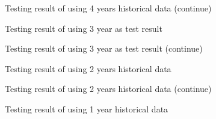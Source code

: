 \begin{figure}[h]
	\centering
	\caption{Testing result of using 4 years historical data (continue)}
	\label{fg:4yearpredict2}
\end{figure}

\begin{figure}[h]
	\centering
	\caption{Testing result of using 3 year as test result}
	\label{fg:3yearpredict1}
\end{figure}

\begin{figure}[h]
	\centering
	\caption{Testing result of using 3 year as test result (continue)}
	\label{fg:3yearpredict2}
\end{figure}

\begin{figure}[h]
	\centering
	\caption{Testing result of using 2 years historical data}
	\label{fg:2yearpredict1}
\end{figure}


\begin{figure}[h]
	\centering
	\caption{Testing result of using 2 years historical data (continue)}
	\label{fg:2yearpredict2}
\end{figure}

\begin{figure}[h]
	\centering
	\caption{Testing result of using 1 year historical data}
	\label{fg:1yearpredict1}
\end{figure}


